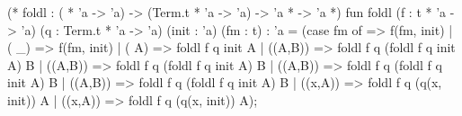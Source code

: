 \nwenddocs{}\endmoddef\nwstartdeflinemarkup{}\nwenddeflinemarkup
(* foldl : ( * 'a -> 'a) -> (Term.t * 'a -> 'a) -> 'a *  -> 'a *)
fun foldl (f : t * 'a -> 'a) (q : Term.t * 'a -> 'a) (init : 'a) (fm : t) : 'a =
  (case fm of
     => f(fm, init)
  | ( _) => f(fm, init)
  | ( A) => foldl f q init A 
  | ((A,B)) => foldl f q (foldl f q init A) B
  | ((A,B)) => foldl f q (foldl f q init A) B
  | ((A,B)) => foldl f q (foldl f q init A) B
  | ((A,B)) => foldl f q (foldl f q init A) B
  | ((x,A)) => foldl f q (q(x, init)) A
  | ((x,A)) => foldl f q (q(x, init)) A);

